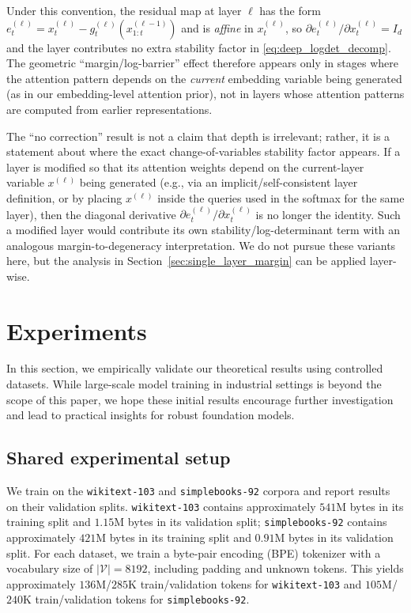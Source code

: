 \documentclass[11pt]{article}
\begin{document}
Under this convention, the residual map at layer $\ell$ has the form
$e^{(\ell)}_t = x^{(\ell)}_t - g^{(\ell)}_t(x^{(\ell-1)}_{1:t})$ and is \emph{affine} in $x^{(\ell)}_t$,
so $\partial e^{(\ell)}_t/\partial x^{(\ell)}_t = I_d$ and the layer contributes no extra stability factor
in \eqref{eq:deep_logdet_decomp}. The geometric ``margin/log-barrier'' effect therefore appears only in
stages where the attention pattern depends on the \emph{current} embedding variable being generated (as in
our embedding-level attention prior), not in layers whose attention patterns are computed from earlier
representations.

The ``no correction'' result is not a claim that depth is irrelevant; rather, it is a statement about where the exact change-of-variables stability factor appears. If a layer is modified so that its attention weights depend on the current-layer variable $x^{(\ell)}$ being generated (e.g., via an implicit/self-consistent layer definition, or by placing $x^{(\ell)}$ inside the queries used in the softmax for the same layer), then the diagonal derivative $\partial e^{(\ell)}_t/\partial x^{(\ell)}_t$ is no longer the identity. Such a modified layer would contribute its own stability/log-determinant term with an analogous margin-to-degeneracy interpretation. We do not pursue these variants here, but the analysis in Section~\ref{sec:single_layer_margin} can be applied layer-wise.

\section{Experiments}
\label{sec:experiments}
In this section, we empirically validate our theoretical results using controlled datasets. While large-scale model training in industrial settings is beyond the scope of this paper, we hope these initial results encourage further investigation and lead to practical insights for robust foundation models.

\subsection{Shared experimental setup}
\label{sec:exp_setup}

We train on the \texttt{wikitext-103} and \texttt{simplebooks-92} corpora \citep{merity2018analysis, nguyen2019simplebooks} and report results on their validation splits.
\texttt{wikitext-103} contains approximately $541\mathrm{M}$ bytes in its training split and $1.15\mathrm{M}$ bytes in its validation split; \texttt{simplebooks-92} contains approximately $421\mathrm{M}$ bytes in its training split and $0.91\mathrm{M}$ bytes in its validation split. 
For each dataset, we train a byte-pair encoding (BPE) tokenizer with a vocabulary size of $|\mathcal{V}|{=}8192$, including padding and unknown tokens. 
This yields approximately $136\mathrm{M}$/$285\mathrm{K}$ train/validation tokens for \texttt{wikitext-103} and $105\mathrm{M}$/$240\mathrm{K}$ train/validation
tokens for \texttt{simplebooks-92}.
\end{document}
